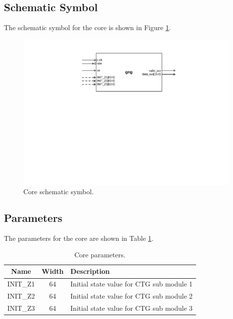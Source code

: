 \documentclass[a4paper, titlepage]{article}
\begin{document}
\subsection{Schematic Symbol}
The schematic symbol for the core is shown in Figure \ref{fig:coresch}.
\begin{figure}[!htbp]
\centering
\includegraphics[scale=0.7,angle=270]{coresch.pdf}
\caption{Core schematic symbol.}
\label{fig:coresch}
\end{figure}

\subsection{Parameters}
The parameters for the core are shown in Table \ref{tbl:coreparam}.
\begin{table}[!htbp]
\centering
\caption{Core parameters.}
\label{tbl:coreparam}
\begin{tabular}{ccl}
    \addlinespace
    \toprule

    \textbf{Name} & \textbf{Width} & \textbf{Description} \\

    \midrule

    \textsf{INIT\_Z1} & 64 & Initial state value for CTG sub module 1 \\
    \textsf{INIT\_Z2} & 64 & Initial state value for CTG sub module 2 \\
    \textsf{INIT\_Z3} & 64 & Initial state value for CTG sub module 3 \\

    \bottomrule
\end{tabular}
\end{table}
\end{document}
